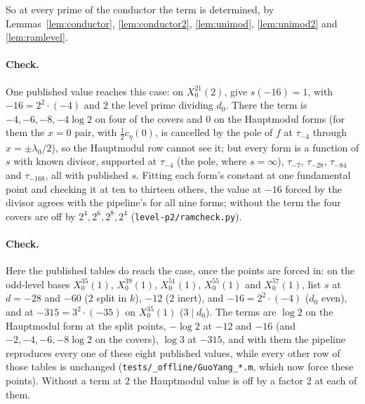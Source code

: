 \documentclass[11pt,reqno]{amsart}
\theoremstyle{plain}
\theoremstyle{definition}
\begin{document}
So at every prime of the conductor the term is determined, by Lemmas~\ref{lem:conductor},
\ref{lem:conductor2}, \ref{lem:unimod}, \ref{lem:unimod2} and \ref{lem:ramlevel}. \paragraph{Check.} One published value reaches this case: on $X_0^{21}(2)$, \cite{GY} give
$s(-16)=1$, with $-16=2^2\cdot(-4)$ and $2$ the level prime dividing $d_0$. There the term is $-4,-6,-8,-4
\log2$ on four of the covers and $0$ on the Hauptmodul forms (for them the $x=0$ pair, with
$\tfrac12c_\eta(0)$, is cancelled by the pole of $f$ at $\tau_{-4}$ through $x=\pm\lambda_0/2$), so
the Hauptmodul row cannot see it; but every form is a function of $s$ with known divisor, supported
at $\tau_{-4}$ (the pole, where $s=\infty$), $\tau_{-7}$, $\tau_{-28}$, $\tau_{-84}$ and $\tau_{-168}$,
all with published $s$. Fitting each form's constant at one fundamental point and checking it at ten
to thirteen others, the value at $-16$ forced by the divisor agrees with the pipeline's for all nine
forms; without the term the four covers are off by $2^4,2^6,2^8,2^4$ (\texttt{level-p2/ramcheck.py}). \paragraph{Check.} Here the published tables do reach the case, once the points are forced in:
on the odd-level bases $X_0^{35}(1)$, $X_0^{39}(1)$, $X_0^{51}(1)$, $X_0^{55}(1)$ and $X_0^{57}(1)$,
\cite{GY} list $s$ at $d=-28$ and $-60$ ($2$ split in $k$), $-12$ ($2$ inert), and $-16=2^2\cdot(-4)$
($d_0$ even), and at $-315=3^2\cdot(-35)$ on $X_0^{35}(1)$ ($3\mid d_0$). The terms are
$\log2$ on the Hauptmodul form at the split points, $-\log2$ at $-12$ and $-16$ (and $-2,-4,-6,-8\log2$
on the covers), $\log3$ at $-315$, and with them the pipeline reproduces every one of these eight
published values, while every other row of those tables is unchanged
(\texttt{tests/\_offline/GuoYang\_*.m}, which now force these points). Without a term at $2$ the
Hauptmodul value is off by a factor $2$ at each of them.
\end{document}

